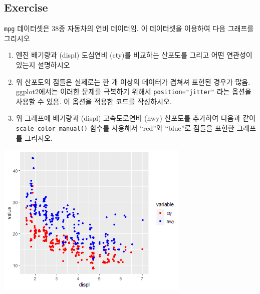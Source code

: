 \documentclass[
]{book}
\newenvironment{Shaded}{\begin{snugshade}}{\end{snugshade}}
\newcommand{\AttributeTok}[1]{\textcolor[rgb]{0.77,0.63,0.00}{#1}}
\newcommand{\FunctionTok}[1]{\textcolor[rgb]{0.00,0.00,0.00}{#1}}
\newcommand{\NormalTok}[1]{#1}
\newcommand{\OtherTok}[1]{\textcolor[rgb]{0.56,0.35,0.01}{#1}}
\newcommand{\SpecialCharTok}[1]{\textcolor[rgb]{0.00,0.00,0.00}{#1}}
\newcommand{\StringTok}[1]{\textcolor[rgb]{0.31,0.60,0.02}{#1}}
\begin{document}
\hypertarget{ex10.3}{%
\subsection{Exercise}\label{ex10.3}}

\texttt{mpg} 데이터셋은 38종 자동차의 연비 데이터임. 이 데이터셋을 이용하여 다음 그래프를 그리시오

\begin{enumerate}
\def\labelenumi{\arabic{enumi})}
\item
  엔진 배기량과 (displ) 도심연비 (cty)를 비교하는 산포도를 그리고 어떤 연관성이 있는지 설명하시오
\item
  위 산포도의 점들은 실제로는 한 개 이상의 데이터가 겹쳐셔 표현된 경우가 많음. ggplot2에서는 이러한 문제를 극복하기 위해서 \texttt{position="jitter"} 라는 옵션을 사용할 수 있음. 이 옵션을 적용한 코드를 작성하시오.
\item
  위 그래프에 배기량과 (displ) 고속도로연비 (hwy) 산포도를 추가하여 다음과 같이 \texttt{scale\_color\_manual()} 함수를 사용해서 ``red''와 ``blue''로 점들을 표현한 그래프를 그리시오.
\end{enumerate}

\begin{Shaded}
\end{Shaded}

\includegraphics[width=3.64583in,height=\textheight]{images/06/ex6-4-2.png}
\end{document}
